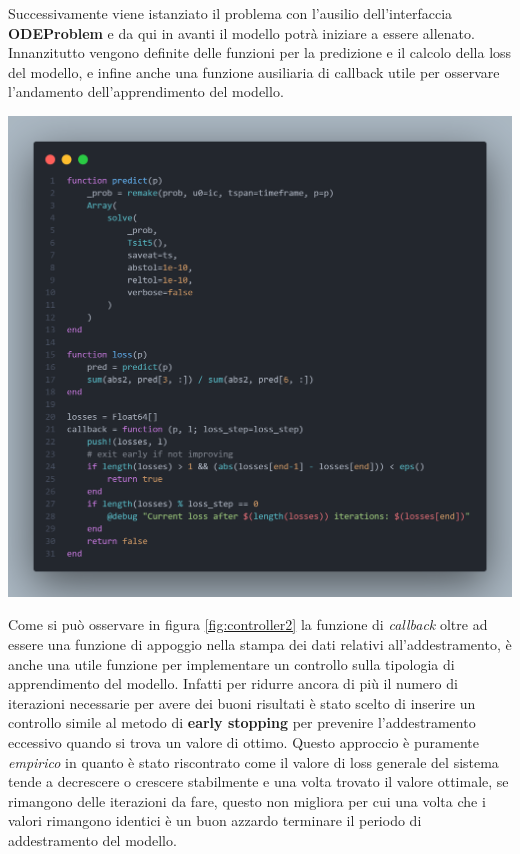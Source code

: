 Successivamente viene istanziato il problema con l'ausilio dell'interfaccia \textbf{ODEProblem} e da qui in avanti il modello potrà iniziare a 
essere allenato. Innanzitutto vengono definite delle funzioni per la predizione e il calcolo della loss del modello, 
e infine anche una funzione ausiliaria di callback utile per osservare l'andamento dell'apprendimento del modello.

\begin{minipage}{\linewidth}
	\centering
	\includegraphics[width=\textwidth]{img/controller2.png}
	\label{fig:controller2}
\end{minipage}

Come si può osservare in figura \ref{fig:controller2} la funzione di \emph{callback} oltre ad essere una funzione di 
appoggio nella stampa dei dati relativi all'addestramento, è anche una utile funzione per implementare un controllo sulla tipologia 
di apprendimento del modello. Infatti per ridurre ancora di più il numero di iterazioni necessarie per avere dei buoni risultati 
è stato scelto di inserire un controllo simile al metodo di \textbf{early stopping} per prevenire 
l'addestramento eccessivo quando si trova un valore di ottimo. Questo approccio è puramente \emph{empirico} in quanto 
è stato riscontrato come il valore di loss generale del sistema tende a decrescere o crescere stabilmente e una volta trovato il 
valore ottimale, se rimangono delle iterazioni da fare, questo non migliora per cui una volta che i valori rimangono identici 
è un buon azzardo terminare il periodo di addestramento del modello.

